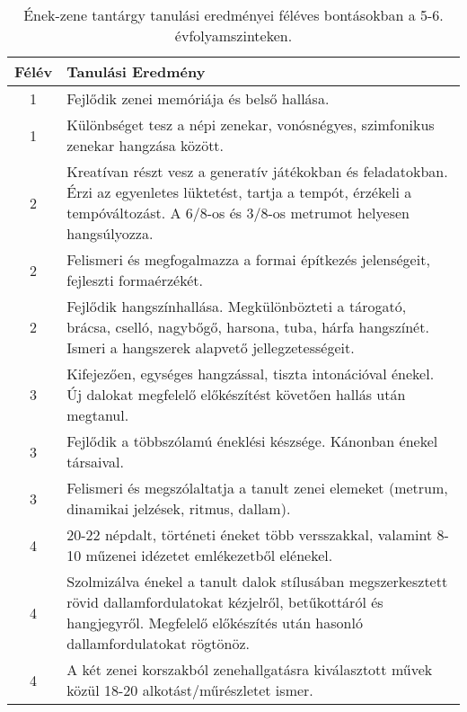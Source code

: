        
           \begin{longtable}{c | p{12cm} }
            \caption[Ének-zene 5-6.]{Ének-zene tantárgy tanulási eredményei féléves bontásokban a 5-6. évfolyamszinteken. }  \\

            \textbf{Félév} & \textbf{Tanulási Eredmény} \\
            \hline
            \endhead
                                
                                          1 &  Fejlődik zenei memóriája és belső hallása. \\ \hline
                                          1 &  Különbséget tesz a népi zenekar, vonósnégyes, szimfonikus zenekar hangzása között. \\ \hline
                                      
                                
                                          2 &  Kreatívan részt vesz a generatív játékokban és feladatokban. Érzi az egyenletes lüktetést, tartja a tempót, érzékeli a tempóváltozást. A 6/8-os és 3/8-os metrumot helyesen hangsúlyozza. \\ \hline
                                          2 &  Felismeri és megfogalmazza a formai építkezés jelenségeit, fejleszti formaérzékét. \\ \hline
                                          2 &  Fejlődik hangszínhallása. Megkülönbözteti a tárogató, brácsa, cselló, nagybőgő, harsona, tuba, hárfa hangszínét. Ismeri a hangszerek alapvető jellegzetességeit. \\ \hline
                                      
                                
                                          3 &  Kifejezően, egységes hangzással, tiszta intonációval énekel. Új dalokat megfelelő előkészítést követően hallás után megtanul. \\ \hline
                                          3 &  Fejlődik a többszólamú éneklési készsége. Kánonban énekel társaival. \\ \hline
                                          3 &  Felismeri és megszólaltatja a tanult zenei elemeket (metrum, dinamikai jelzések, ritmus, dallam). \\ \hline
                                      
                                
                                          4 &  20-22 népdalt, történeti éneket több versszakkal, valamint 8-10 műzenei idézetet emlékezetből elénekel. \\ \hline
                                          4 &  Szolmizálva énekel a tanult dalok stílusában megszerkesztett rövid dallamfordulatokat kézjelről, betűkottáról és hangjegyről. Megfelelő előkészítés után hasonló dallamfordulatokat rögtönöz. \\ \hline
                                          4 &  A két zenei korszakból zenehallgatásra kiválasztott művek közül 18-20 alkotást/műrészletet ismer. \\ \hline
                                      
                        \end{longtable}
            \clearpage

